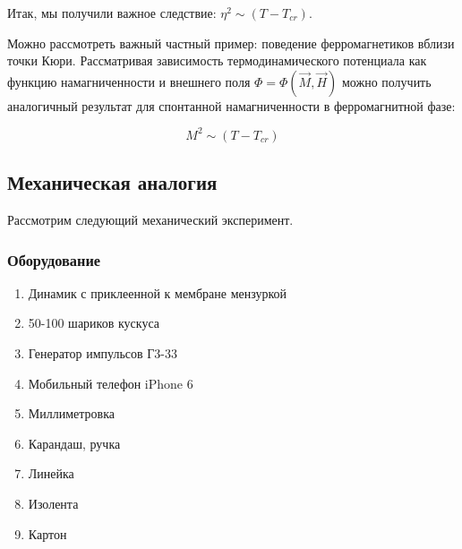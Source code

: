 \documentclass[a4paper, 12pt]{article}
\begin{document}
Итак, мы получили важное следствие: $\eta^2 \sim (T - T_{cr})$. 

Можно рассмотреть важный частный пример: поведение ферромагнетиков вблизи точки Кюри. Рассматривая зависимость термодинамического потенциала как функцию намагниченности и внешнего поля $\Phi = \Phi(\vec{M}, \vec{H})$ можно получить аналогичный результат для спонтанной намагниченности в ферромагнитной фазе:

$$
	M^2 \sim (T - T_{cr})
$$


\subsection*{Механическая аналогия}

Рассмотрим следующий механический эксперимент. 

\subsubsection*{Оборудование}

\begin{enumerate}
	\item Динамик с приклеенной к мембране мензуркой
	\item 50-100 шариков кускуса
	\item Генератор импульсов Г3-33
	\item Мобильный телефон iPhone 6
	\item Миллиметровка
	\item Карандаш, ручка
	\item Линейка
	\item Изолента
	\item Картон
\end{enumerate}
\end{document}
